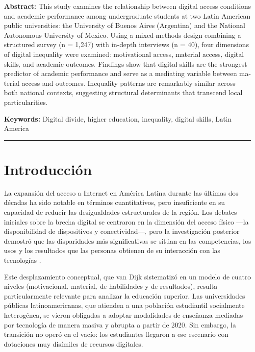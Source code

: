 \begin{tcolorbox}[colback=brown!8!white,colframe=brown!8!white,boxrule=0pt,arc=2pt,left=4pt,right=4pt,top=3pt,bottom=3pt,before skip=4pt,after skip=4pt]
\begin{otherlanguage}{english}
\sffamily\small \textbf{Abstract:} This study examines the relationship between digital access conditions and academic performance among undergraduate students at two Latin American public universities: the University of Buenos Aires (Argentina) and the National Autonomous University of Mexico. Using a mixed-methods design combining a structured survey (n = 1,247) with in-depth interviews (n = 40), four dimensions of digital inequality were examined: motivational access, material access, digital skills, and academic outcomes. Findings show that digital skills are the strongest predictor of academic performance and serve as a mediating variable between material access and outcomes. Inequality patterns are remarkably similar across both national contexts, suggesting structural determinants that transcend local particularities.
\par\smallskip\noindent\textbf{Keywords:} Digital divide, higher education, inequality, digital skills, Latin America
\end{otherlanguage}
\end{tcolorbox}

\bigskip
\noindent\rule{\linewidth}{0.4pt}
\bigskip

\section{Introducción}
La expansión del acceso a Internet en América Latina durante las últimas dos décadas ha sido notable en términos cuantitativos, pero insuficiente en su capacidad de reducir las desigualdades estructurales de la región. Los debates iniciales sobre la brecha digital se centraron en la dimensión del acceso físico —la disponibilidad de dispositivos y conectividad—, pero la investigación posterior demostró que las disparidades más significativas se sitúan en las competencias, los usos y los resultados que las personas obtienen de su interacción con las tecnologías \autocite{2565-HARGITTAI2002,2562-WARSCHAUER2004}.

Este desplazamiento conceptual, que van Dijk \autocite*{2563-VANDIJK2020} sistematizó en un modelo de cuatro niveles (motivacional, material, de habilidades y de resultados), resulta particularmente relevante para analizar la educación superior. Las universidades públicas latinoamericanas, que atienden a una población estudiantil socialmente heterogénea, se vieron obligadas a adoptar modalidades de enseñanza mediadas por tecnología de manera masiva y abrupta a partir de 2020. Sin embargo, la transición no operó en el vacío: los estudiantes llegaron a ese escenario con dotaciones muy disímiles de recursos digitales.

